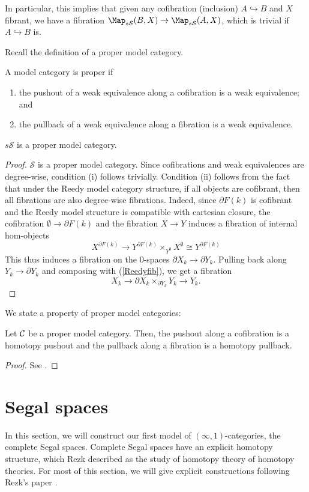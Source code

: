 In particular, this implies that given any cofibration (inclusion) $A\hookrightarrow B$ and $X$ fibrant, we have a fibration $\Map_{s\mathcal S}(B,X)\to\Map_{s\mathcal S}(A,X)$, which is trivial if $A\hookrightarrow B$ is.

Recall the definition of a proper model category.
\begin{defin}
A model category is proper if
\begin{enumerate}
\item the pushout of a weak equivalence along a cofibration is a weak equivalence; and
\item the pullback of a weak equivalence along a fibration is a weak equivalence.
\end{enumerate}
\end{defin}

\begin{prop}
$s\mathcal S$ is a proper model category.
\end{prop}
\begin{proof}
$\mathcal S$ is a proper model category. Since cofibrations and weak equivalences are degree-wise, condition (i) follows trivially.
Condition (ii) follows from the fact that under the Reedy model category structure, if all objects are cofibrant, then all fibrations are also degree-wise fibrations. Indeed, since $\partial F(k)$ is cofibrant and the Reedy model structure is compatible with cartesian closure, the cofibration $\emptyset\to\partial F(k)$ and the fibration $X\to Y$ induces a fibration of internal hom-objects
$$X^{\partial F(k)}\to Y^{\partial F(k)}\times_{Y^\emptyset}X^\emptyset\cong Y^{\partial F(k)}$$
This thus induces a fibration on the 0-spaces $\partial X_k\to\partial Y_k$. Pulling back along $Y_k\to\partial Y_k$ and composing with (\ref{Reedyfib}), we get a fibration
$$X_k\to\partial X_k\times_{\partial Y_k}Y_k\to Y_k.$$
\end{proof}

We state a property of proper model categories:

\begin{prop}\label{hompullback}
Let $\cal C$ be a proper model category. Then, the pushout along a cofibration is a homotopy pushout and the pullback along a fibration is a homotopy pullback.
\end{prop}
\begin{proof}
See \cite[Prop A.2.2.4]{htt}.
\end{proof}

\section{Segal spaces}
In this section, we will construct our first model of $(\infty,1)$-categories, the complete Segal spaces. Complete Segal spaces have an explicit homotopy structure, which Rezk described as the study of homotopy theory of homotopy theories. For most of this section, we will give explicit constructions following Rezk's paper \cite{rezk}.

